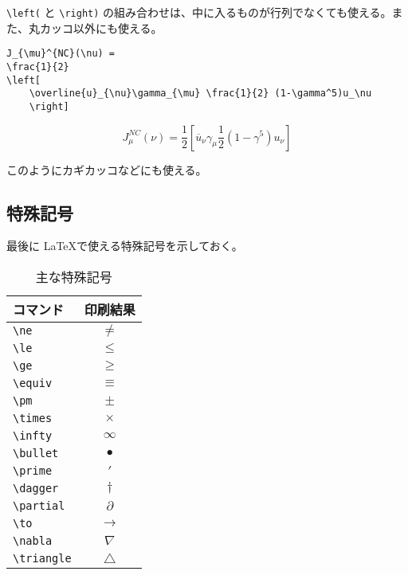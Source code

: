 \verb|\left(| と \verb|\right)| の組み合わせは、中に入るものが行列でなくても使える。また、丸カッコ以外にも使える。
\begin{reidai}
    \begin{verbatim}
J_{\mu}^{NC}(\nu) =
\frac{1}{2}
\left[
    \overline{u}_{\nu}\gamma_{\mu} \frac{1}{2} (1-\gamma^5)u_\nu
    \right]
\end{verbatim}
\end{reidai}
\vspace*{-1.5em}
\begin{kekka}
    \begin{equation}
        J_{\mu}^{NC}(\nu) =
        \frac{1}{2}
        \left[
            \overline{u}_{\nu}\gamma_{\mu} \frac{1}{2} (1-\gamma^5)u_\nu
            \right]
    \end{equation}
    \vspace{0pt}
\end{kekka} \noindent
このようにカギカッコなどにも使える。

\subsection{特殊記号}
\label{sec:latex:symbol}

最後に \LaTeX で使える特殊記号を示しておく。
\begin{table}[H]
    \centering
    \caption{主な特殊記号}
    \label{tab:symbol}
    \begin{tabular}{|lc|}
        \hline
        コマンド                 & 印刷結果      \\
        \hline \hline
        \verb|\ne|  & \(\ne\)       \\
        \verb|\le|  & \(\le\)       \\
        \verb|\ge|  & \(\ge\)       \\
        \verb|\equiv|  & \(\equiv\)    \\
        \verb|\pm|  & \(\pm\)       \\
        \verb|\times|  & \(\times\)    \\
        \verb|\infty|  & \(\infty\)    \\
        \verb|\bullet|  & \(\bullet\)   \\
        \verb|\prime| & \(\prime\)    \\
        \verb|\dagger| & \(\dagger\)   \\
        \verb|\partial| & \(\partial\)  \\
        \verb|\to| & \(\to\)       \\
        \verb|\nabla| & \(\nabla\)    \\
        \verb|\triangle| & \(\triangle\) \\
        \hline
    \end{tabular}
\end{table}

